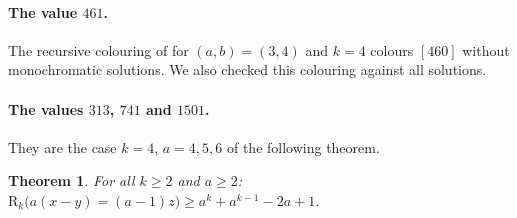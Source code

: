 \documentclass[11pt,a4paper]{article}
\newtheorem{theorem}{Theorem}[section]
\theoremstyle{definition}
\theoremstyle{remark}
\newcommand{\R}{\mathrm{R}}
\begin{document}
\paragraph{The value $461$.} The recursive colouring of \cite[Lemma~4.1 and Theorem~4.5]{Ich26b} for $(a,b)=(3,4)$ and $k=4$ colours $[460]$ without monochromatic solutions. We also checked this colouring against all solutions.

\paragraph{The values $313$, $741$ and $1501$.} They are the case $k=4$, $a=4,5,6$ of the following theorem.

\begin{theorem}\label{thm:H3}
For all $k\ge2$ and $a\ge2$:\quad $\R_k\bigl(a(x-y)=(a-1)z\bigr)\ge a^k+a^{k-1}-2a+1$.
\end{theorem}
\end{document}
